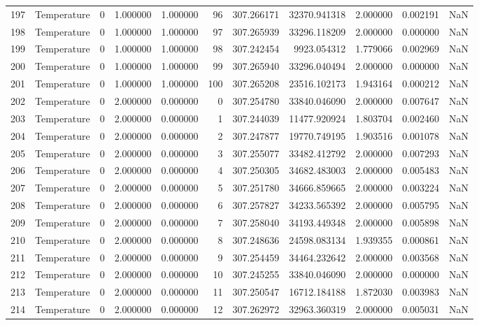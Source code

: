 \begin{tabular}{llrrrrrrrrr}
197 & Temperature & 0 & 1.000000 & 1.000000 & 96 & 307.266171 & 32370.941318 & 2.000000 & 0.002191 & NaN \\
198 & Temperature & 0 & 1.000000 & 1.000000 & 97 & 307.265939 & 33296.118209 & 2.000000 & 0.000000 & NaN \\
199 & Temperature & 0 & 1.000000 & 1.000000 & 98 & 307.242454 & 9923.054312 & 1.779066 & 0.002969 & NaN \\
200 & Temperature & 0 & 1.000000 & 1.000000 & 99 & 307.265940 & 33296.040494 & 2.000000 & 0.000000 & NaN \\
201 & Temperature & 0 & 1.000000 & 1.000000 & 100 & 307.265208 & 23516.102173 & 1.943164 & 0.000212 & NaN \\
202 & Temperature & 0 & 2.000000 & 0.000000 & 0 & 307.254780 & 33840.046090 & 2.000000 & 0.007647 & NaN \\
203 & Temperature & 0 & 2.000000 & 0.000000 & 1 & 307.244039 & 11477.920924 & 1.803704 & 0.002460 & NaN \\
204 & Temperature & 0 & 2.000000 & 0.000000 & 2 & 307.247877 & 19770.749195 & 1.903516 & 0.001078 & NaN \\
205 & Temperature & 0 & 2.000000 & 0.000000 & 3 & 307.255077 & 33482.412792 & 2.000000 & 0.007293 & NaN \\
206 & Temperature & 0 & 2.000000 & 0.000000 & 4 & 307.250305 & 34682.483003 & 2.000000 & 0.005483 & NaN \\
207 & Temperature & 0 & 2.000000 & 0.000000 & 5 & 307.251780 & 34666.859665 & 2.000000 & 0.003224 & NaN \\
208 & Temperature & 0 & 2.000000 & 0.000000 & 6 & 307.257827 & 34233.565392 & 2.000000 & 0.005795 & NaN \\
209 & Temperature & 0 & 2.000000 & 0.000000 & 7 & 307.258040 & 34193.449348 & 2.000000 & 0.005898 & NaN \\
210 & Temperature & 0 & 2.000000 & 0.000000 & 8 & 307.248636 & 24598.083134 & 1.939355 & 0.000861 & NaN \\
211 & Temperature & 0 & 2.000000 & 0.000000 & 9 & 307.254459 & 34464.232642 & 2.000000 & 0.003568 & NaN \\
212 & Temperature & 0 & 2.000000 & 0.000000 & 10 & 307.245255 & 33840.046090 & 2.000000 & 0.000000 & NaN \\
213 & Temperature & 0 & 2.000000 & 0.000000 & 11 & 307.250547 & 16712.184188 & 1.872030 & 0.003983 & NaN \\
214 & Temperature & 0 & 2.000000 & 0.000000 & 12 & 307.262972 & 32963.360319 & 2.000000 & 0.005031 & NaN \\

\end{tabular}
